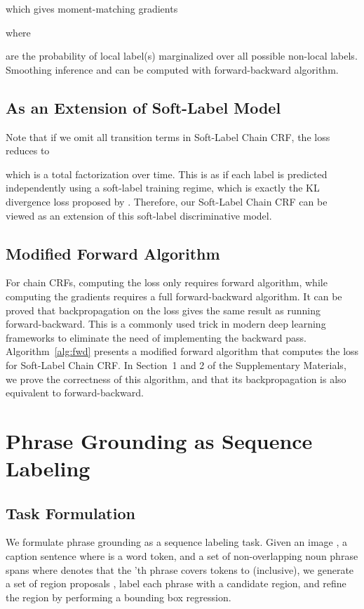 \documentclass[11pt,a4paper]{article}
\begin{document}
which gives moment-matching gradients

where

are the probability of local label(s) marginalized over all possible non-local labels. Smoothing inference  and  can be computed with forward-backward algorithm. 

\subsection{As an Extension of Soft-Label Model}
\label{ssec:sl}

Note that if we omit all transition terms in Soft-Label Chain CRF, the loss reduces to

which is a total factorization over time. This is as if each label is predicted independently using a soft-label training regime, which is exactly the KL divergence loss proposed by \citet{DBLP:conf/ijcai/YuYXZ0T18}. Therefore, our Soft-Label Chain CRF can be viewed as an extension of this soft-label discriminative model. 

\subsection{Modified Forward Algorithm}

For chain CRFs, computing the loss only requires forward algorithm, while computing the gradients requires a full forward-backward algorithm. It can be proved that backpropagation on the loss gives the same result as running forward-backward. This is a commonly used trick in modern deep learning frameworks to eliminate the need of implementing the backward pass. Algorithm~\ref{alg:fwd} presents a modified forward algorithm that computes the loss for Soft-Label Chain CRF. In Section~1 and 2 of the Supplementary Materials, we prove the correctness of this algorithm, and that its backpropagation is also equivalent to forward-backward. 

\section{Phrase Grounding as Sequence Labeling}
\label{sec:pg-sl}

\subsection{Task Formulation}

We formulate phrase grounding as a sequence labeling task. Given an image , a caption sentence  where  is a word token, and a set of non-overlapping noun phrase spans  where  denotes that the 'th phrase covers tokens  to  (inclusive), we generate a set of region proposals , label each phrase with a candidate region, and refine the region by performing a bounding box regression. 
\end{document}
